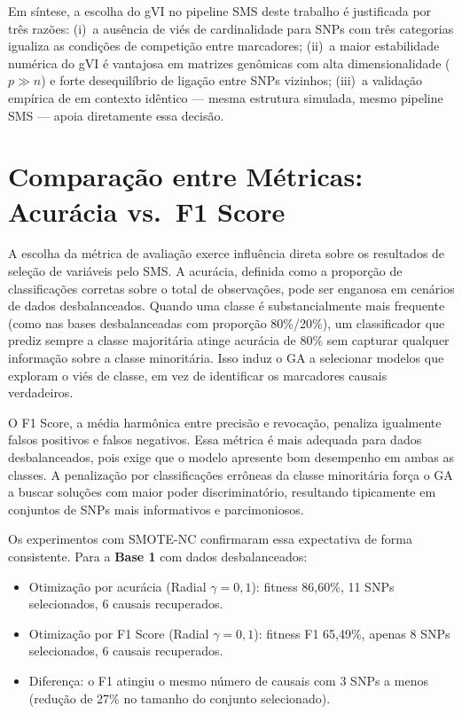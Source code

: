 \documentclass[
    12pt,
    a4paper,
    oneside,
    english,
    french,
    spanish,
    brazil
    ]{abntex2}
\newcommand{\novo}[1]{\textcolor{corNova}{#1}}
\begin{document}
\novo{Em síntese, a escolha do gVI no pipeline SMS deste trabalho é justificada por três razões: (i)~a ausência de viés de cardinalidade para SNPs com três categorias igualiza as condições de competição entre marcadores; (ii)~a maior estabilidade numérica do gVI é vantajosa em matrizes genômicas com alta dimensionalidade ($p \gg n$) e forte desequilíbrio de ligação entre SNPs vizinhos; (iii)~a validação empírica de \citeonline{Oliveira2015} em contexto idêntico --- mesma estrutura simulada, mesmo pipeline SMS --- apoia diretamente essa decisão.}

\chapter{Comparação entre Métricas: Acurácia vs.\ F1 Score}

\novo{A escolha da métrica de avaliação exerce influência direta sobre os resultados de seleção de variáveis pelo SMS. A acurácia, definida como a proporção de classificações corretas sobre o total de observações, pode ser enganosa em cenários de dados desbalanceados. Quando uma classe é substancialmente mais frequente (como nas bases desbalanceadas com proporção 80\%/20\%), um classificador que prediz sempre a classe majoritária atinge acurácia de 80\% sem capturar qualquer informação sobre a classe minoritária. Isso induz o GA a selecionar modelos que exploram o viés de classe, em vez de identificar os marcadores causais verdadeiros.}

\novo{O F1 Score, a média harmônica entre precisão e revocação, penaliza igualmente falsos positivos e falsos negativos. Essa métrica é mais adequada para dados desbalanceados, pois exige que o modelo apresente bom desempenho em ambas as classes. A penalização por classificações errôneas da classe minoritária força o GA a buscar soluções com maior poder discriminatório, resultando tipicamente em conjuntos de SNPs mais informativos e parcimoniosos.}

\novo{Os experimentos com SMOTE-NC confirmaram essa expectativa de forma consistente. Para a \textbf{Base 1} com dados desbalanceados:}
\begin{itemize}
  \item \novo{Otimização por acurácia (Radial $\gamma = 0{,}1$): fitness 86,60\%, 11 SNPs selecionados, 6 causais recuperados.}
  \item \novo{Otimização por F1 Score (Radial $\gamma = 0{,}1$): fitness F1 65,49\%, apenas 8 SNPs selecionados, 6 causais recuperados.}
  \item \novo{Diferença: o F1 atingiu o mesmo número de causais com 3 SNPs a menos (redução de 27\% no tamanho do conjunto selecionado).}
\end{itemize}
\end{document}
